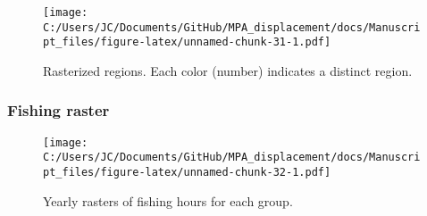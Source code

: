 \documentclass[11pt,]{article}
\begin{document}
\begin{figure}
\centering
\texttt{[image: C:/Users/JC/Documents/GitHub/MPA\_displacement/docs/Manuscript\_files/figure-latex/unnamed-chunk-31-1.pdf]}
\caption{\label{fig:unnamed-chunk-31}\label{fig:raster_rgn}Rasterized
regions. Each color (number) indicates a distinct region.}
\end{figure}

\hypertarget{fishing-raster}{%
\subsubsection{Fishing raster}\label{fishing-raster}}

\begin{figure}
\centering
\texttt{[image: C:/Users/JC/Documents/GitHub/MPA\_displacement/docs/Manuscript\_files/figure-latex/unnamed-chunk-32-1.pdf]}
\caption{\label{fig:unnamed-chunk-32}\label{fig:fishing_raster_full}Yearly
rasters of fishing hours for each group.}
\end{figure}

\clearpage
\end{document}
